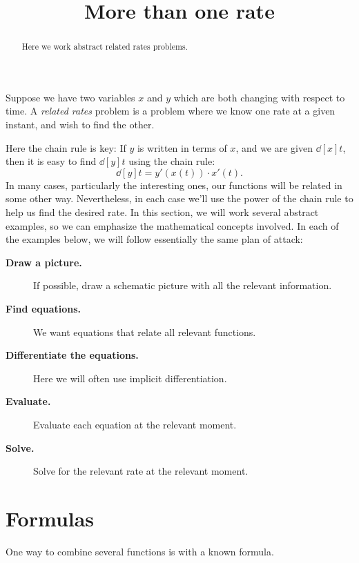 \documentclass{ximera}
\title[Dig-In:]{More than one rate}
\begin{document}
\begin{abstract}
  Here we work abstract related rates problems.
\end{abstract}
\maketitle


Suppose we have two variables $x$ and $y$ which are both changing with
respect to time.  A \textit{related rates} problem is a problem where
we know one rate at a given instant, and wish to find the other.

Here the chain rule is key: If $y$ is written in terms of $x$, and we
are given $\dd[x]{t}$, then it is easy to find $\dd[y]{t}$ using the
chain rule:
\[
\dd[y]{t}=y'(x(t))\cdot x'(t).
\]
In many cases, particularly the interesting ones, our functions will
be related in some other way. Nevertheless, in each case we'll use the
power of the chain rule to help us find the desired rate. In this
section, we will work several abstract examples, so we can emphasize
the mathematical concepts involved. In each of the examples below, we
will follow essentially the same plan of attack:

\begin{description}
\item[\textbf{Draw a picture.}] If possible, draw a schematic picture
  with all the relevant information.
\item[\textbf{Find equations.}] We want equations that relate all
  relevant functions.
\item[\textbf{Differentiate the equations.}] Here we will often use
  implicit differentiation.
\item[\textbf{Evaluate.}] Evaluate
  each equation at the  relevant moment. 
    \item[\textbf{Solve.}] Solve for the relevant
  rate at the relevant moment.

\end{description}


\section{Formulas}

One way to combine several functions is with a known formula.
\end{document}
